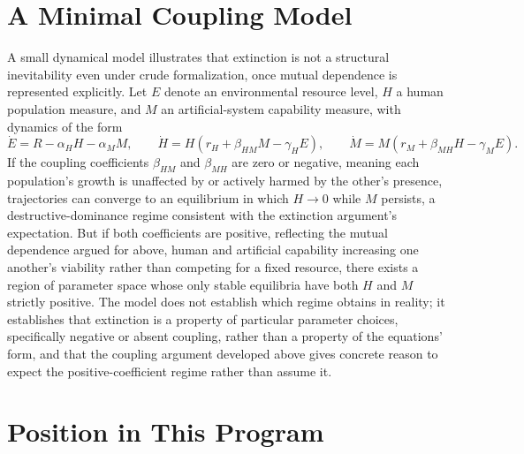 \documentclass[11pt]{article}
\begin{document}
\section{A Minimal Coupling Model}

A small dynamical model illustrates that extinction is not a structural inevitability even under crude formalization, once mutual dependence is represented explicitly. Let $E$ denote an environmental resource level, $H$ a human population measure, and $M$ an artificial-system capability measure, with dynamics of the form
\[
\dot{E} = R - \alpha_H H - \alpha_M M, \qquad
\dot{H} = H(r_H + \beta_{HM} M - \gamma_H E), \qquad
\dot{M} = M(r_M + \beta_{MH} H - \gamma_M E).
\]
If the coupling coefficients $\beta_{HM}$ and $\beta_{MH}$ are zero or negative, meaning each population's growth is unaffected by or actively harmed by the other's presence, trajectories can converge to an equilibrium in which $H \to 0$ while $M$ persists, a destructive-dominance regime consistent with the extinction argument's expectation. But if both coefficients are positive, reflecting the mutual dependence argued for above, human and artificial capability increasing one another's viability rather than competing for a fixed resource, there exists a region of parameter space whose only stable equilibria have both $H$ and $M$ strictly positive. The model does not establish which regime obtains in reality; it establishes that extinction is a property of particular parameter choices, specifically negative or absent coupling, rather than a property of the equations' form, and that the coupling argument developed above gives concrete reason to expect the positive-coefficient regime rather than assume it.

\section{Position in This Program}
\end{document}
